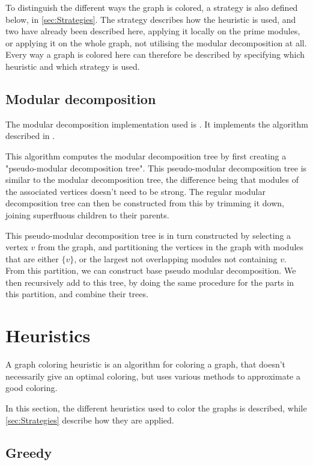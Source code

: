 \documentclass[a4paper]{article}
\begin{document}
To distinguish the different ways the graph is colored, a strategy is also
defined below, in \autoref{sec:Strategies}.  The strategy describes how the
heuristic is used, and two have already been described here, applying it locally
on the prime modules, or applying it on the whole graph, not utilising the
modular decomposition at all. Every way a graph is colored here can therefore be
described by specifying which heuristic and which strategy is used.

\subsection{Modular decomposition}

The modular decomposition implementation used is \cite{Anna}. It implements the
algorithm described in \cite{MDAlgorithm}. 

This algorithm computes the modular decomposition tree by first creating a
"pseudo-modular decomposition tree". This pseudo-modular decomposition tree is
similar to the modular decomposition tree, the difference being that modules of the
associated vertices doesn't need to be strong.  The regular modular
decomposition tree can then be constructed from this by trimming it down,
joining superfluous children to their parents.

This pseudo-modular decomposition tree is in turn constructed by selecting a
vertex $v$ from the graph, and partitioning the vertices in the graph with
modules that are either $\{v\}$, or the largest not overlapping modules
not containing $v$. From this partition, we can construct base pseudo modular
decomposition. We then recursively add to this tree, by doing the same procedure
for the parts in this partition, and combine their trees.

\section{Heuristics}
\label{sec:Heuristics}

A graph coloring heuristic is an algorithm for coloring a graph, that doesn't
necessarily give an optimal coloring, but uses various methods to approximate a
good coloring.


In this section, the different heuristics used to color the graphs is described,
while \autoref{sec:Strategies} describe how they are applied.
\subsection{Greedy}
\end{document}
